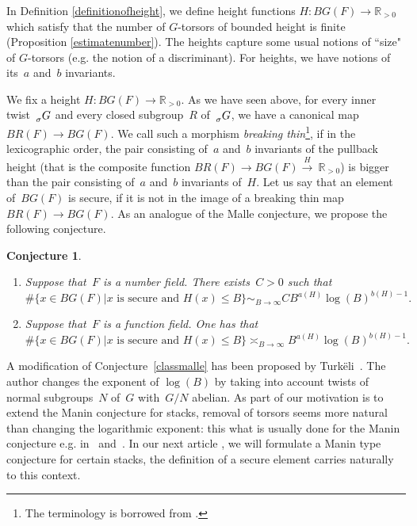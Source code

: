 \documentclass[a4paper,english,12pt]{amsart}
\newcommand{\RR}{\mathbb{R}}
\newcommand{\sG}{\prescript{}{\sigma}G}
\newtheorem{conj}[equation]{Conjecture}
\numberwithin{equation}{subsection}
\begin{document}
\subsubsection{}In Definition \ref{definitionofheight}, we define height functions $H:BG(F)\to\RR_{>0}$ which satisfy that the number of $G$-torsors of bounded height is finite (Proposition \ref{estimatenumber}). The heights capture some usual notions of ``size" of $G$-torsors (e.g. the notion of a discriminant). For heights, we have notions of its~$a$ and~$b$ invariants. 

We fix a height $H:BG(F)\to\RR_{>0}$. As we have seen above, for every inner twist~$\sG$ and every closed subgroup~$R$ of~$\sG$, we have a canonical map $BR(F)\to BG(F)$. We call such a morphism {\it breaking thin}\footnote{The terminology is borrowed from \cite{geometricconsitencymanin}.}, if in the lexicographic order, the pair consisting of~$a$ and~$b$ invariants of the pullback height (that is the composite function $BR(F)\to BG(F)\xrightarrow{H}~\RR_{>0}$) is bigger than the pair consisting of~$a$ and~$b$ invariants of~$H$. Let us say that an element of~$BG(F)$ is secure, if it is not in the image of a breaking thin map $BR(F)\to BG(F)$. As an analogue of the Malle conjecture, we propose the following conjecture.
\begin{conj}\label{introversionconj}
\begin{enumerate}
\item Suppose that~$F$ is a number field. There exists~$C>0$ such that $$\#\{x\in BG(F)|\text{$x$ is secure and }H(x)\leq B\}\sim_{B\to \infty} CB^{a(H)}\log (B)^{b(H)-1}.$$
\item Suppose that~$F$ is a function field. One has that $$\#\{x\in BG(F)|\text{$x$ is secure and }H(x)\leq B\}\asymp_{B\to \infty} B^{a(H)}\log (B)^{b(H)-1}. $$
\end{enumerate}
\end{conj}
A modification of Conjecture~\ref{classmalle} has been proposed by Turk\"eli~\cite{turkeli}. The author changes the exponent of $\log(B)$ by taking into account twists of normal subgroups~$N$ of~$G$ with~$G/N$ abelian. As part of our motivation is to extend the Manin conjecture for stacks, removal of torsors seems more natural than changing the logarithmic exponent: this what is usually done for the Manin conjecture e.g. in~\cite{peyrethin} and~\cite{geometricconsitencymanin}. In our next article \cite{dardayasudabm}, we will formulate a Manin type conjecture for certain stacks, the definition of a secure element carries naturally to this context.
\end{document}
